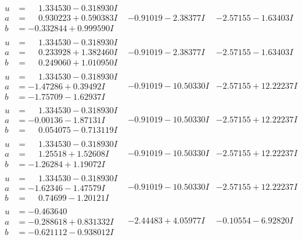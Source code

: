 \documentclass[1p]{elsarticle_modified}
\theoremstyle{definition}
\begin{document}
$$\begin{array}{c|c|c}
\begin{aligned}
u &= \phantom{-}1.334530 - 0.318930 I \\
a &= \phantom{-}0.930223 + 0.590383 I \\
b &= -0.332844 + 0.999590 I\end{aligned}
 & -0.91019 - 2.38377 I & -2.57155 - 1.63403 I \\ \hline\begin{aligned}
u &= \phantom{-}1.334530 - 0.318930 I \\
a &= \phantom{-}0.233928 + 1.382460 I \\
b &= \phantom{-}0.249060 + 1.010950 I\end{aligned}
 & -0.91019 - 2.38377 I & -2.57155 - 1.63403 I \\ \hline\begin{aligned}
u &= \phantom{-}1.334530 - 0.318930 I \\
a &= -1.47286 + 0.39492 I \\
b &= -1.75709 - 1.62937 I\end{aligned}
 & -0.91019 - 10.50330 I & -2.57155 + 12.22237 I \\ \hline\begin{aligned}
u &= \phantom{-}1.334530 - 0.318930 I \\
a &= -0.00136 - 1.87131 I \\
b &= \phantom{-}0.054075 - 0.713119 I\end{aligned}
 & -0.91019 - 10.50330 I & -2.57155 + 12.22237 I \\ \hline\begin{aligned}
u &= \phantom{-}1.334530 - 0.318930 I \\
a &= \phantom{-}1.25518 + 1.52608 I \\
b &= -1.26284 + 1.19072 I\end{aligned}
 & -0.91019 - 10.50330 I & -2.57155 + 12.22237 I \\ \hline\begin{aligned}
u &= \phantom{-}1.334530 - 0.318930 I \\
a &= -1.62346 - 1.47579 I \\
b &= \phantom{-}0.74699 - 1.20121 I\end{aligned}
 & -0.91019 - 10.50330 I & -2.57155 + 12.22237 I \\ \hline\begin{aligned}
u &= -0.463640\phantom{ +0.000000I} \\
a &= -0.288618 + 0.831332 I \\
b &= -0.621112 - 0.938012 I\end{aligned}
 & -2.44483 + 4.05977 I & -0.10554 - 6.92820 I \\ \hline\begin{aligned}

\end{aligned}
\end{array}$$
\end{document}
